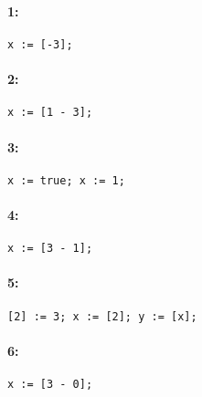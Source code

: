   
  \paragraph{1:}
  \texttt{x := [-3];}

  \paragraph{2:}
  \texttt{x := [1 - 3];}

  \paragraph{3:}
  \texttt{x := true; x := 1;}

  \paragraph{4:}
  \texttt{x := [3 - 1];}

  \paragraph{5:}
  \texttt{[2] := 3; x := [2]; y := [x];}

  \paragraph{6:}
  \texttt{x := [3 - 0];}
    
